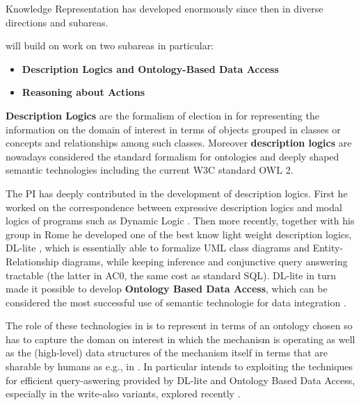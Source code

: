 Knowledge Representation has developed enormously since then in
diverse directions and subareas. 

\project will build on work on two subareas in particular:
\begin{itemize}
\item \textbf{Description Logics and Ontology-Based Data Access}
\item \textbf{Reasoning about Actions}
\end{itemize}

\textbf{Description Logics} are the formalism of election in for
representing the information on the domain of interest in terms of
objects grouped in classes or concepts and relationships among such
classes.  Moreover \textbf{description logics} are nowadays considered
the standard formalism for ontologies and deeply shaped semantic
technologies including the current W3C standard OWL 2.

The PI has deeply contributed in the development of description
logics. First he worked on the correspondence between expressive
description logics and modal logics of programs such as Dynamic Logic \cite{KR06,PODS98}.
Then more recently, together with his group in Rome he developed one
of the best know light weight description logics, DL-lite \cite{JODS07}, which is essentially
able to formalize UML class diagrams and Entity-Relationship diagrams,
while keeping inference and conjunctive query answering tractable (the
latter in AC0, the same cost as standard SQL). DL-lite in turn made it possible to develop \textbf{Ontology Based Data Access}, which can be considered the most successful use of semantic technologie for data integration \cite{PoggiLCGLR08,SequedaM17,Statoil17}. 

The role of these technologies in \project is to represent in terms of an ontology chosen so has to capture the doman on interest in which the mechanism is operating as well as the (high-level) data structures of the mechanism itself in terms that are sharable by humans as e.g., in \cite{TenorthB17}. In particular \project intends to exploiting the techniques for efficient query-aswering provided by DL-lite and Ontology Based Data Access, especially in the write-also variants, explored recently \cite{ISWC16,ISWC17}.






